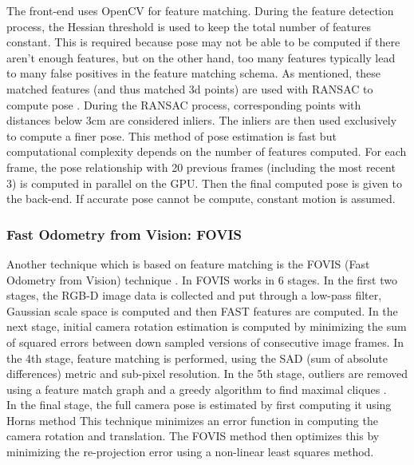 The front-end uses OpenCV \cite{Bradski08Learning} for feature matching. During the feature detection process, the Hessian threshold is used to keep the total number of features constant. This is required because pose may not be able to be computed if there aren't enough features, but on the other hand, too many features typically lead to many false positives in the feature matching schema. As mentioned, these matched features (and thus matched 3d points) are used with RANSAC to compute pose \cite{Umeyama91Least}. During the RANSAC process, corresponding points with distances below 3cm are considered inliers. The inliers are then used exclusively to compute a finer pose. This method of pose estimation is fast but computational complexity depends on the number of features computed. For each frame, the pose relationship with 20 previous frames (including the most recent 3) is computed in parallel on the GPU. Then the final computed pose is given to the back-end. If accurate pose cannot be compute, constant motion is assumed. \\

\subsubsection{Fast Odometry from Vision: FOVIS}

Another technique which is based on feature matching is the FOVIS (Fast Odometry from Vision) technique \cite{Huang17Visual}. In FOVIS works in 6 stages. In the first two stages, the RGB-D image data is collected and put through a low-pass filter, Gaussian scale space is computed and then FAST features \cite{Rosten06Machine,Rosten05Fusing} are computed. In the next stage, initial camera rotation estimation is computed by minimizing the sum of squared errors between down sampled versions of consecutive image frames. In the 4th stage, feature matching is performed, using the SAD (sum of absolute differences) metric and sub-pixel resolution. In the 5th stage, outliers are removed using a feature match graph and a greedy algorithm to find maximal cliques \cite{Hirschmuller02Fast,Howard08Real}. \\

In the final stage, the full camera pose is estimated by first computing it using Horns method \cite{Horn87Closed} This technique minimizes an error function in computing the camera rotation and translation. The FOVIS method then optimizes this by minimizing the re-projection error using a non-linear least squares method. \\

